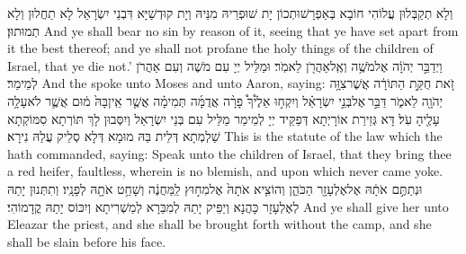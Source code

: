 {וְלָא תְקַבְּלוּן עֲלוֹהִי חוֹבָא בְּאַפְרָשׁוּתְכוֹן יָת שׁוּפְרֵיהּ מִנֵּיהּ וְיָת קוּדְשַׁיָּא דִּבְנֵי יִשְׂרָאֵל לָא תַחֲלוּן וְלָא תְמוּתוּן׃}
{And ye shall bear no sin by reason of it, seeing that ye have set apart from it the best thereof; and ye shall not profane the holy things of the children of Israel, that ye die not.’}{}
\newperek
{}
\label{maft_parah}
{וַיְדַבֵּ֣ר יְהֹוָ֔ה אֶל\maqqaf מֹשֶׁ֥ה וְאֶֽל\maqqaf אַהֲרֹ֖ן לֵאמֹֽר׃}
{וּמַלֵּיל יְיָ עִם מֹשֶׁה וְעִם אַהֲרֹן לְמֵימַר׃}
{And the \lord\space spoke unto Moses and unto Aaron, saying:}{}
{זֹ֚את חֻקַּ֣ת הַתּוֹרָ֔ה אֲשֶׁר\maqqaf צִוָּ֥ה יְהֹוָ֖ה לֵאמֹ֑ר דַּבֵּ֣ר \legarmeh  אֶל\maqqaf בְּנֵ֣י יִשְׂרָאֵ֗ל וְיִקְח֣וּ אֵלֶ֩יךָ֩ פָרָ֨ה אֲדֻמָּ֜ה תְּמִימָ֗ה אֲשֶׁ֤ר אֵֽין\maqqaf בָּהּ֙ מ֔וּם אֲשֶׁ֛ר לֹא\maqqaf עָלָ֥ה עָלֶ֖יהָ עֹֽל׃}
{דָּא גְּזֵירַת אוֹרָיְתָא דְּפַקֵּיד יְיָ לְמֵימַר מַלֵּיל עִם בְּנֵי יִשְׂרָאֵל וְיִסְּבוּן לָךְ תּוֹרְתָא סִמּוֹקְתָא שַׁלְמְתָא דְּלֵית בַּהּ מוּמָא דְּלָא סְלֵיק עֲלַהּ נִירָא׃}
{This is the statute of the law which the \lord\space hath commanded, saying: Speak unto the children of Israel, that they bring thee a red heifer, faultless, wherein is no blemish, and upon which never came yoke.}{}
{וּנְתַתֶּ֣ם אֹתָ֔הּ אֶל\maqqaf אֶלְעָזָ֖ר הַכֹּהֵ֑ן וְהוֹצִ֤יא אֹתָהּ֙ אֶל\maqqaf מִח֣וּץ לַֽמַּחֲנֶ֔ה וְשָׁחַ֥ט אֹתָ֖הּ לְפָנָֽיו׃}
{וְתִתְּנוּן יָתַהּ לְאֶלְעָזָר כָּהֲנָא וְיַפֵּיק יָתַהּ לְמִבַּרָא לְמַשְׁרִיתָא וְיִכּוֹס יָתַהּ קֳדָמוֹהִי׃}
{And ye shall give her unto Eleazar the priest, and she shall be brought forth without the camp, and she shall be slain before his face.}{}
